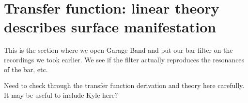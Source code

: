 \section{Transfer function: linear theory describes surface manifestation}
\label{sec:transfer_verification}

This is the section where we open Garage Band and put our bar filter on the recordings we took earlier.
We see if the filter actually reproduces the resonances of the bar, etc.

Need to check through the transfer function derivation and theory here carefully. 
It may be useful to include Kyle here?


